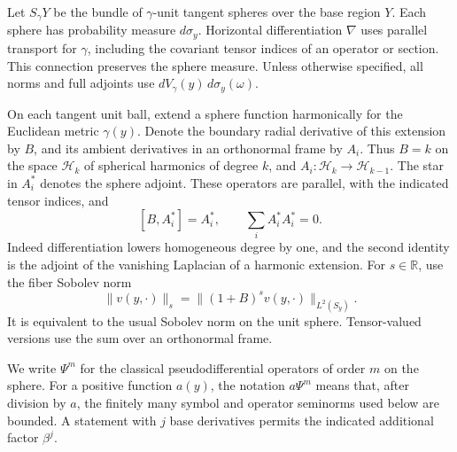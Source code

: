 \documentclass[11pt]{article}
\theoremstyle{definition}
\theoremstyle{remark}
\numberwithin{equation}{section}
\begin{document}
Let $S_\gamma Y$ be the bundle of $\gamma$-unit tangent spheres over the
base region $Y$.  Each sphere has probability measure $d\sigma_y$.
Horizontal differentiation $\nabla$ uses parallel transport for $\gamma$,
including the covariant tensor indices of an operator or section.  This
connection preserves the sphere measure.  Unless otherwise specified, all
norms and full adjoints use $dV_\gamma(y)\,d\sigma_y(\omega)$.

On each tangent unit ball, extend a sphere function harmonically for the
Euclidean metric $\gamma(y)$.  Denote the boundary radial derivative of
this extension by $B$, and its ambient derivatives in an orthonormal frame
by $A_i$.  Thus $B=k$ on the space $\mathcal H_k$ of spherical harmonics
of degree $k$, and $A_i:\mathcal H_k\to\mathcal H_{k-1}$.  The star in
$A_i^*$ denotes the sphere adjoint.  These operators are parallel, with
the indicated tensor indices, and
\begin{equation}\label{angular:elementary-identities}
 [B,A_i^*]=A_i^*,\qquad \sum_i A_i^*A_i^*=0.
\end{equation}
Indeed differentiation lowers homogeneous degree by one, and the second
identity is the adjoint of the vanishing Laplacian of a harmonic extension.
For $s\in\mathbb R$, use the fiber Sobolev norm
\[
 \|v(y,\cdot)\|_s=\|(1+B)^s v(y,\cdot)\|_{L^2(S_y)}.
\]
It is equivalent to the usual Sobolev norm on the unit sphere.  Tensor-valued
versions use the sum over an orthonormal frame.

We write $\Psi^m$ for the classical pseudodifferential operators of order
$m$ on the sphere.  For a positive function $a(y)$, the notation
$a\Psi^m$ means that, after division by $a$, the finitely many symbol and
operator seminorms used below are bounded.  A statement with $j$ base
derivatives permits the indicated additional factor $\beta^j$.
\end{document}
